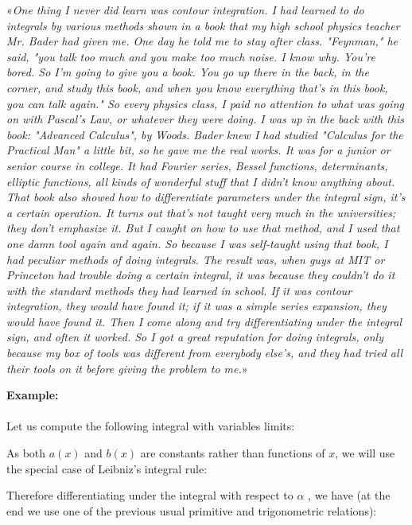 	«\textit{One thing I never did learn was contour integration. I had learned to do integrals by various methods shown in a book that my high school physics teacher Mr. Bader had given me. One day he told me to stay after class. "Feynman," he said, "you talk too much and you make too much noise. I know why. You're bored. So I'm going to give you a book. You go up there in the back, in the corner, and study this book, and when you know everything that's in this book, you can talk again." So every physics class, I paid no attention to what was going on with Pascal's Law, or whatever they were doing. I was up in the back with this book: "Advanced Calculus", by Woods. Bader knew I had studied "Calculus for the Practical Man" a little bit, so he gave me the real works. It was for a junior or senior course in college. It had Fourier series, Bessel functions, determinants, elliptic functions, all kinds of wonderful stuff that I didn't know anything about. That book also showed how to differentiate parameters under the integral sign, it's a certain operation. It turns out that's not taught very much in the universities; they don't emphasize it. But I caught on how to use that method, and I used that one damn tool again and again. So because I was self-taught using that book, I had peculiar methods of doing integrals. The result was, when guys at MIT or Princeton had trouble doing a certain integral, it was because they couldn't do it with the standard methods they had learned in school. If it was contour integration, they would have found it; if it was a simple series expansion, they would have found it. Then I come along and try differentiating under the integral sign, and often it worked. So I got a great reputation for doing integrals, only because my box of tools was different from everybody else's, and they had tried all their tools on it before giving the problem to me.}»
	
	
	\begin{tcolorbox}[colframe=black,colback=white,sharp corners]
	\textbf{{\Large {}}Example:}\\\\
	Let us compute the following integral with variables limits:
	
	As both $a(x)$ and $b(x)$ are constants rather than functions of $x$, we will use the special case of Leibniz's integral rule:
	
	Therefore differentiating under the integral with respect to $\alpha$ , we have (at the end we use one of the previous usual primitive and trigonometric relations):
	
	\end{tcolorbox}
	
